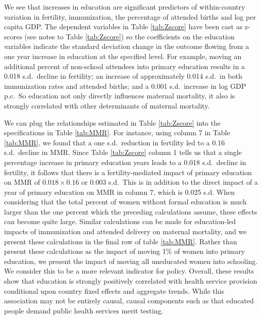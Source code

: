 \documentclass{article}[12pt,subeqn]
\begin{document}
\begin{spacing}{1.4}
We see that increases in education are significant predictors of within-country variation in fertility,
immunization, the percentage of attended births and log per capita GDP. The dependent variables in Table 
\ref{tab:Zscore} have been cast as z-scores (see notes to Table \ref{tab:Zscore}) so the coefficients on 
the education variables indicate the standard deviation change in the outcome flowing from a one year increase 
in education at the specified level. For example, moving an additional percent of non-school attendees into 
primary education results in a 0.018 s.d.\ decline in fertility; an increase of approximately 0.014 s.d.\ in 
both immunization rates and attended births; and a 0.001 s.d.\ increase in log GDP p.c.\ So education not only 
directly influences maternal mortality, it also is strongly correlated with other determinants of maternal mortality.

We can plug the relationships estimated in Table \ref{tab:Zscore} into the specifications in Table \ref{tab:MMR}. 
For instance, using column 7 in Table \ref{tab:MMR}, we found that a one s.d.\ reduction in fertility led to a 
0.16 s.d.\ decline in MMR. Since Table \ref{tab:Zscore} column 1 tells us that a single percentage increase in 
primary education years leads to a 0.018 s.d.\ decline in fertility, it follows that there is a fertility-mediated 
impact of primary education on MMR of $0.018\times 0.16$ or 0.003 s.d.\ This is in addition to the direct impact 
of a year of primary education on MMR in column 7, which is 0.025 s.d. When considering that the total percent of 
women without formal education is much larger than the one percent which the preceding calculations assume, these 
effects can become quite large. Similar calculations can be made for education-led impacts of immunization and 
attended delivery on maternal mortality, and we present these calculations in the final row of table \ref{tab:MMR}. 
Rather than present these calculations as the impact of moving 1\% of women into primary education, we present the 
impact of moving all uneducated women into schooling. We consider this to be a more relevant indicator for policy.
Overall, these results show that education is strongly positively correlated with health service provision conditional 
upon country fixed effects and aggregate trends. While this association may not be entirely causal, causal components 
such as that educated people demand public health services merit testing.



\end{spacing}
\end{document}
